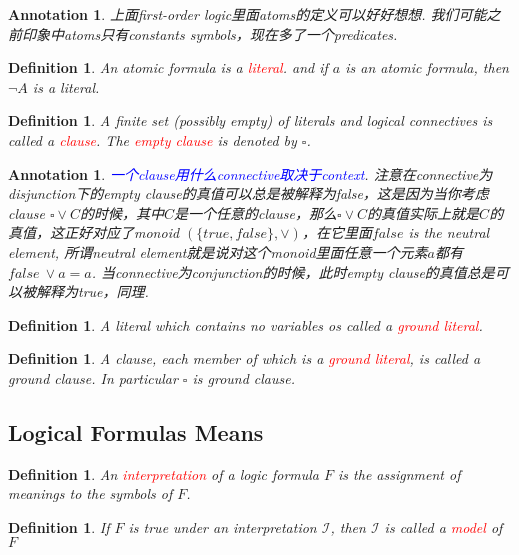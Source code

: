 \documentclass{article}
\theoremstyle{plain}
\newtheorem{definition}[theorem]{Definition}
\newtheorem{annotation}[theorem]{Annotation}
\theoremstyle{nonumberplain}
\newcommand{\redt}[1]{\textcolor{red}{#1}}
\newcommand{\bluet}[1]{\textcolor{blue}{#1}}
\begin{document}
\begin{annotation}
\rm 上面first-order logic里面atoms的定义可以好好想想. 我们可能之前印象中atoms只有constants symbols，现在多了一个predicates. 
\end{annotation}

\begin{definition}
\rm An atomic formula is a \redt{literal}. and if $a$ is an atomic formula, then $\neg A$ is a literal.
\end{definition}

\begin{definition}
\rm A finite set (possibly empty) of literals and logical connectives is called a \redt{clause}. The \redt{empty clause} is denoted by $\square$.
\end{definition}

\begin{annotation}
\rm \bluet{一个clause用什么connective取决于context}. 注意在connective为disjunction下的empty clause的真值可以总是被解释为false，这是因为当你考虑clause $\square \vee C$的时候，其中$C$是一个任意的clause，那么$\square \vee C$的真值实际上就是$C$的真值，这正好对应了monoid $(\{true,false\}, \vee)$，在它里面$false$ is the neutral element, 所谓neutral element就是说对这个monoid里面任意一个元素$a$都有$false ~\vee a = a$. 当connective为conjunction的时候，此时empty clause的真值总是可以被解释为true，同理. 
\end{annotation}

\begin{definition}
\rm A literal which contains no variables os called a \redt{ground literal}.
\end{definition}

\begin{definition}
\rm A clause, each member of which is a \redt{ground literal}, is called a ground clause. In particular $\square$ is ground clause.
\end{definition}

\newpage
\subsection{Logical Formulas Means}

\begin{definition}
\rm An \redt{interpretation} of a logic formula $F$ is the assignment of meanings to the symbols of $F$.
\end{definition}


\begin{definition}
\rm If $F$ is true under an interpretation $\mathcal{I}$, then $\mathcal{I}$ is called a \redt{model} of $F$
\end{definition}
\end{document}
